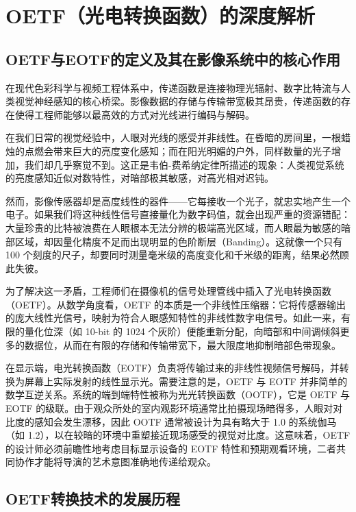 \documentclass[12pt, a4paper]{ctexart}
\begin{document}
\section{OETF（光电转换函数）的深度解析}

\subsection{OETF与EOTF的定义及其在影像系统中的核心作用}

在现代色彩科学与视频工程体系中，传递函数是连接物理光辐射、数字比特流与人类视觉神经感知的核心桥梁。影像数据的存储与传输带宽极其昂贵，传递函数的存在使得工程师能够以最高效的方式对光线进行编码与解码。

在我们日常的视觉经验中，人眼对光线的感受并非线性。在昏暗的房间里，一根蜡烛的点燃会带来巨大的亮度变化感知；而在阳光明媚的户外，同样数量的光子增加，我们却几乎察觉不到。这正是韦伯-费希纳定律所描述的现象：人类视觉系统的亮度感知近似对数特性，对暗部极其敏感，对高光相对迟钝。

然而，影像传感器却是高度线性的器件——它每接收一个光子，就忠实地产生一个电子。如果我们将这种线性信号直接量化为数字码值，就会出现严重的资源错配：大量珍贵的比特被浪费在人眼根本无法分辨的极端高光区域，而人眼最为敏感的暗部区域，却因量化精度不足而出现明显的色阶断层（Banding）。这就像一个只有 100 个刻度的尺子，却要同时测量毫米级的高度变化和千米级的距离，结果必然顾此失彼。

为了解决这一矛盾，工程师们在摄像机的信号处理管线中插入了光电转换函数（OETF）。从数学角度看，OETF 的本质是一个非线性压缩器：它将传感器输出的庞大线性光信号，映射为符合人眼感知特性的非线性数字电信号。如此一来，有限的量化位深（如 10-bit 的 1024 个灰阶）便能重新分配，向暗部和中间调倾斜更多的数据位，从而在有限的存储和传输带宽下，最大限度地抑制暗部色带现象。

在显示端，电光转换函数（EOTF）负责将传输过来的非线性视频信号解码，并转换为屏幕上实际发射的线性显示光。需要注意的是，OETF 与 EOTF 并非简单的数学互逆关系。系统的端到端特性被称为光光转换函数（OOTF），它是 OETF 与 EOTF 的级联。由于观众所处的室内观影环境通常比拍摄现场暗得多，人眼对对比度的感知会发生漂移，因此 OOTF 通常被设计为具有略大于 1.0 的系统伽马（如 1.2），以在较暗的环境中重塑接近现场感受的视觉对比度。这意味着，OETF 的设计师必须前瞻性地考虑目标显示设备的 EOTF 特性和预期观看环境，二者共同协作才能将导演的艺术意图准确地传递给观众。

\subsection{OETF转换技术的发展历程}
\end{document}
